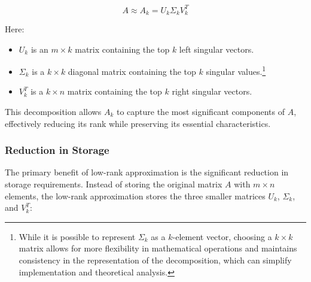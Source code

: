     \[
    A \approx A_k = U_k \Sigma_k V_k^T
    \]
    
    Here:
    \begin{itemize}
        \item $U_k$ is an $m \times k$ matrix containing the top $k$ left singular vectors.
        \item $\Sigma_k$ is a $k \times k$ diagonal matrix containing the top $k$ singular values.\footnote{While it is possible to represent $\Sigma_k$ as a $k$-element vector, choosing a $k \times k$ matrix allows for more flexibility in mathematical operations and maintains consistency in the representation of the decomposition, which can simplify implementation and theoretical analysis.}
        \item $V_k^T$ is a $k \times n$ matrix containing the top $k$ right singular vectors.
    \end{itemize}
    
    This decomposition allows $A_k$ to capture the most significant components of $A$, effectively reducing its rank while preserving its essential characteristics.
    
    \subsubsection{Reduction in Storage}\label{sec:reduction_storage}
    
    The primary benefit of low-rank approximation is the significant reduction in storage requirements. Instead of storing the original matrix $A$ with $m \times n$ elements, the low-rank approximation stores the three smaller matrices $U_k$, $\Sigma_k$, and $V_k^T$:
    

